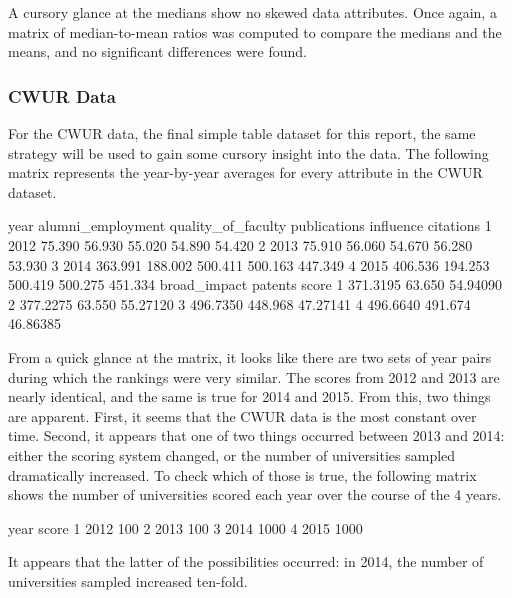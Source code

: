 \documentclass[12pt]{article}
\begin{document}
A cursory glance at the medians show no skewed data attributes. Once again, a matrix of median-to-mean ratios was computed to compare the medians and the means, and no significant differences were found.

\subsubsection{CWUR Data}

For the CWUR data, the final simple table dataset for this report, the same strategy will be used to gain some cursory insight into the data. The following matrix represents the year-by-year averages for every attribute in the CWUR dataset.
\begin{Schunk}
\begin{Soutput}
  year alumni_employment quality_of_faculty publications influence citations
1 2012            75.390             56.930       55.020    54.890    54.420
2 2013            75.910             56.060       54.670    56.280    53.930
3 2014           363.991            188.002      500.411   500.163   447.349
4 2015           406.536            194.253      500.419   500.275   451.334
  broad_impact patents    score
1     371.3195  63.650 54.94090
2     377.2275  63.550 55.27120
3     496.7350 448.968 47.27141
4     496.6640 491.674 46.86385
\end{Soutput}
\end{Schunk}

From a quick glance at the matrix, it looks like there are two sets of year pairs during which the rankings were very similar. The scores from 2012 and 2013 are nearly identical, and the same is true for 2014 and 2015. From this, two things are apparent. First, it seems that the CWUR data is the most constant over time. Second, it appears that one of two things occurred between 2013 and 2014: either the scoring system changed, or the number of universities sampled dramatically increased. To check which of those is true, the following matrix shows the number of universities scored each year over the course of the 4 years.

\begin{Schunk}
\begin{Soutput}
  year score
1 2012   100
2 2013   100
3 2014  1000
4 2015  1000
\end{Soutput}
\end{Schunk}

It appears that the latter of the possibilities occurred: in 2014, the number of universities sampled increased ten-fold.
\end{document}
